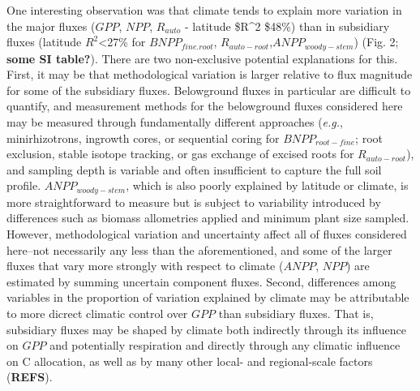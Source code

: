 \documentclass[]{article}
\begin{document}
One interesting observation was that climate tends to explain more
variation in the major fluxes (\(GPP\), \(NPP\), \(R_{auto}\) - latitude
\$R\^{}2 \ge\$48\%) than in subsidiary fluxes (latitude
\(R^2\)\textless{}27\% for \(BNPP_{fine.root}\),
\(R_{auto-root}\),\(ANPP_{woody-stem}\)) (Fig. 2; \textbf{some SI
table?}). There are two non-exclusive potential explanations for this.
First, it may be that methodological variation is larger relative to
flux magnitude for some of the subsidiary fluxes. Belowground fluxes in
particular are difficult to quantify, and measurement methods for the
belowground fluxes considered here may be measured through fundamentally
different approaches (\emph{e.g.}, minirhizotrons, ingrowth cores, or
sequential coring for \(BNPP_{root-fine}\); root exclusion, stable
isotope tracking, or gas exchange of excised roots for
\(R_{auto-root}\)), and sampling depth is variable and often
insufficient to capture the full soil profile. \(ANPP_{woody-stem}\),
which is also poorly explained by latitude or climate, is more
straightforward to measure but is subject to variability introduced by
differences such as biomass allometries applied and minimum plant size
sampled. However, methodological variation and uncertainty affect all of
fluxes considered here--not necessarily any less than the
aforementioned, and some of the larger fluxes that vary more strongly
with respect to climate (\(ANPP\), \(NPP\)) are estimated by summing
uncertain component fluxes. Second, differences among variables in the
proportion of variation explained by climate may be attributable to more
dicrect climatic control over \(GPP\) than subsidiary fluxes. That is,
subsidiary fluxes may be shaped by climate both indirectly through its
influence on \(GPP\) and potentially respiration and directly through
any climatic influence on C allocation, as well as by many other local-
and regional-scale factors (\textbf{REFS}).
\end{document}
